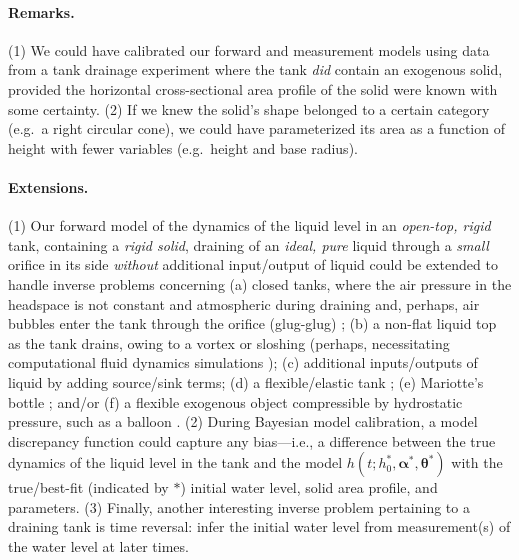 \documentclass[a4paper,fleqn]{cas-dc}
\begin{document}
\paragraph{Remarks.} (1) We could have calibrated our forward and measurement models using data from a tank drainage experiment where the tank \emph{did} contain an exogenous solid, provided the horizontal cross-sectional area profile of the solid were known with some certainty. (2) If we knew the solid's shape belonged to a certain category (e.g.\ a right circular cone), we could have parameterized its area as a function of height with fewer variables (e.g.\ height and base radius). 

\paragraph{Extensions.}
(1) Our forward model of the dynamics of the liquid level in an \emph{open-top, rigid} tank, containing a \emph{rigid solid}, draining of an \emph{ideal, pure} liquid through a \emph{small} orifice in its side \emph{without} additional input/output of liquid could be extended to handle inverse problems concerning
(a) closed tanks, where the air pressure in the headspace is not constant and atmospheric during draining \cite{cross2016filling} and, perhaps, air bubbles enter the tank through the orifice (glug-glug) \cite{mayer2019bottle,clanet2004glug}; 
(b) a non-flat liquid top as the tank drains, owing to a vortex \cite{caquas2023bathtub} or sloshing \cite{ibrahim2005liquid} (perhaps, necessitating computational fluid dynamics simulations \cite{mathew2014numerical,sakri2017numerical});
(c) additional inputs/outputs of liquid by adding source/sink terms; 
(d) a flexible/elastic tank \cite{velankar2024soft};
(e) Mariotte's bottle \cite{kirevs2006mariotte}; and/or
(f) a flexible exogenous object compressible by hydrostatic pressure, such as a balloon \cite{muller2004rubber}. 
(2) During Bayesian model calibration, a model discrepancy \cite{brynjarsdottir2014learning,kennedy2001bayesian,eugene2023learning} function could capture any bias---i.e., a difference between the true dynamics of the liquid level in the tank and the model $h(t; h_0^*,  \boldsymbol \alpha^*, \boldsymbol \theta^*)$ with the true/best-fit (indicated by $*$) initial water level, solid area profile, and parameters.
(3) Finally, another interesting inverse problem pertaining to a draining tank is time reversal: infer the initial water level from measurement(s) of the water level at later times.
\end{document}
